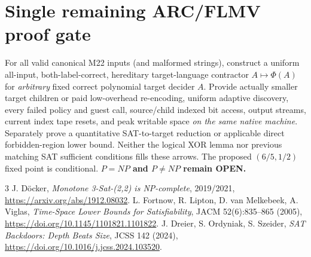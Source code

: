 \documentclass[11pt]{article}
\begin{document}
\section{Single remaining ARC/FLMV proof gate}
For all valid canonical M22 inputs (and malformed strings), construct a uniform all-input, both-label-correct, hereditary target-language contractor $A\mapsto\Phi(A)$ for \emph{arbitrary} fixed correct polynomial target decider $A$. Provide actually smaller target children or paid low-overhead re-encoding, uniform adaptive discovery, every failed policy and guest call, source/child indexed bit access, output streams, current index tape resets, and peak writable space \emph{on the same native machine}. Separately prove a quantitative SAT-to-target reduction or applicable direct forbidden-region lower bound. Neither the logical XOR lemma nor previous matching SAT sufficient conditions fills these arrows. The proposed $(6/5,1/2)$ fixed point is conditional. \textbf{$P=NP$ and $P\ne NP$ remain OPEN.}
\begin{thebibliography}{3}
 J. D\"ocker, \emph{Monotone 3-Sat-(2,2) is NP-complete}, 2019/2021, \url{https://arxiv.org/abs/1912.08032}.
 L. Fortnow, R. Lipton, D. van Melkebeek, A. Viglas, \emph{Time-Space Lower Bounds for Satisfiability}, JACM 52(6):835--865 (2005), \url{https://doi.org/10.1145/1101821.1101822}.
 J. Dreier, S. Ordyniak, S. Szeider, \emph{SAT Backdoors: Depth Beats Size}, JCSS 142 (2024), \url{https://doi.org/10.1016/j.jcss.2024.103520}.
\end{thebibliography}
\end{document}
